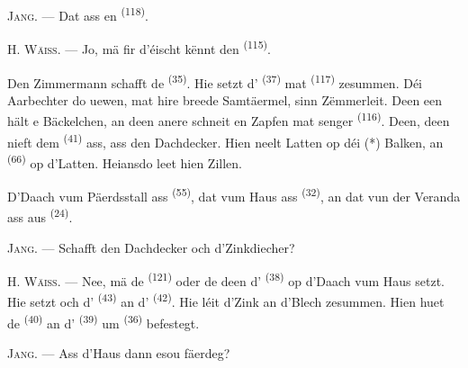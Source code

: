 \textsc{Jang}. --- Dat ass en  \textsuperscript{(118)}.

\VUsaut{3.0mm}
\VUsaut{3.0mm}

H. \textsc{Wäiss}. --- Jo, mä fir d'éischt kënnt den 
\textsuperscript{(115)}.

Den Zimmermann schafft de  \textsuperscript{(35)}. Hie setzt
d' \textsuperscript{(37)} mat  \textsuperscript{(117)}
zesummen. Déi Aarbechter do uewen, mat hire breede Samtäermel, sinn Zëmmerleit. Deen
een hält e Bäckelchen, an deen anere schneit en Zapfen mat senger 
\textsuperscript{(116)}. Deen, deen nieft dem  \textsuperscript{(41)}
ass, ass den Dachdecker. Hien neelt Latten op déi (*) Balken, an 
\textsuperscript{(66)} op d'Latten. Heiansdo leet hien Zillen.


D'Daach vum Päerdsstall ass  \textsuperscript{(55)}, dat
vum Haus ass  \textsuperscript{(32)}, an dat vun der
Veranda ass aus  \textsuperscript{(24)}.

\textsc{Jang}. --- Schafft den Dachdecker och d'Zinkdiecher?

H. \textsc{Wäiss}. --- Nee, mä de  \textsuperscript{(121)} oder de
 deen d' \textsuperscript{(38)} op d'Daach
vum Haus setzt. Hie setzt och d' \textsuperscript{(43)} an
d' \textsuperscript{(42)}. Hie léit d'Zink an d'Blech zesummen.
Hien huet de  \textsuperscript{(40)} an d'
\textsuperscript{(39)} um  \textsuperscript{(36)} befestegt.

\textsc{Jang}. --- Ass d'Haus dann esou fäerdeg?

